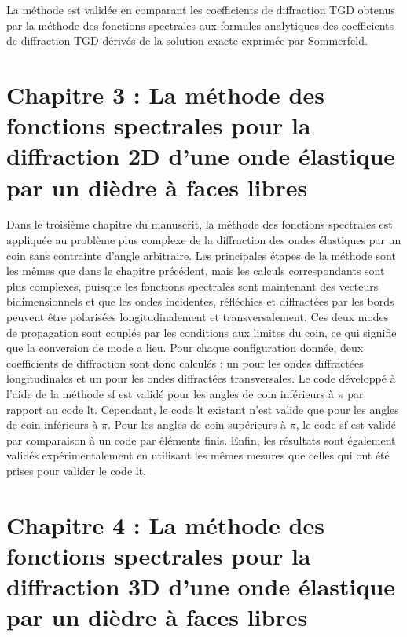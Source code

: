 La méthode est validée en comparant les coefficients de diffraction TGD obtenus par la méthode des fonctions spectrales aux formules analytiques des coefficients de diffraction TGD dérivés de la solution exacte exprimée par Sommerfeld.

\section[Résumé du chapitre 3]{Chapitre 3 : La méthode des fonctions spectrales pour la diffraction 2D d'une onde élastique par un dièdre à faces libres}

Dans le troisième chapitre du manuscrit, la méthode des fonctions spectrales est appliquée au problème plus complexe de la diffraction des ondes élastiques par un coin sans contrainte d'angle arbitraire. Les principales étapes de la méthode sont les mêmes que dans le chapitre précédent, mais les calculs correspondants sont plus complexes, puisque les fonctions spectrales sont maintenant des vecteurs bidimensionnels et que les ondes incidentes, réfléchies et diffractées par les bords peuvent être polarisées longitudinalement et transversalement. Ces deux modes de propagation sont couplés par les conditions aux limites du coin, ce qui signifie que la conversion de mode a lieu. Pour chaque configuration donnée, deux coefficients de diffraction sont donc calculés : un pour les ondes diffractées longitudinales et un pour les ondes diffractées transversales. Le code développé à l'aide de la méthode \acrfull{sf} est validé pour les angles de coin inférieurs à $\pi$ par rapport au code \acrfull{lt}. Cependant, le code \acrshort{lt} existant n'est valide que pour les angles de coin inférieurs à $\pi$. Pour les angles de coin supérieurs à $\pi$, le code \acrshort{sf} est validé par comparaison à un code par éléments finis. Enfin, les résultats sont également validés expérimentalement en utilisant les mêmes mesures que celles qui ont été prises pour valider le code \acrshort{lt}.

\section[Résumé du chapitre 4]{Chapitre 4 : La méthode des fonctions spectrales pour la diffraction 3D d'une onde élastique par un dièdre à faces libres}

